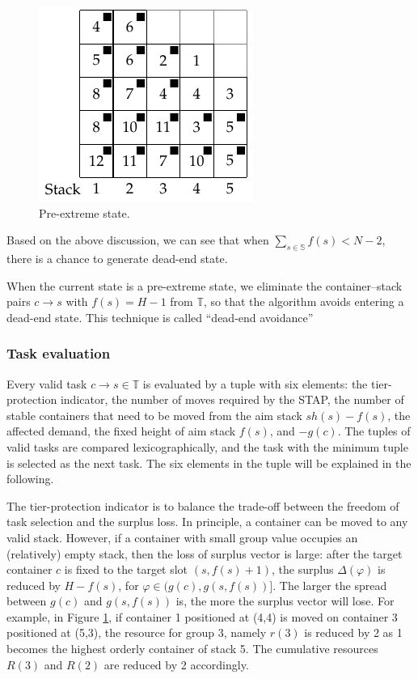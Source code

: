 \documentclass[review,3p,times,12pt,number]{elsarticle}\usepackage{amsmath}\usepackage{amssymb}
\begin{document}
\begin{figure}[htbp]
\centering
\includegraphics{figs/c.pdf}
\caption{Pre-extreme state.}
\label{fig:pre-extreme}
\end{figure}
Based on the above discussion, we can see that when $\sum_{s\in\mathbb{S}}f(s)<N-2$, there is a chance to generate dead-end state.

When the current state is a pre-extreme state, we eliminate the container--stack pairs $c\rightarrow s$ with $f(s)=H-1$ from $\mathbb T$, so that the algorithm avoids entering a dead-end state. This technique is called ``dead-end avoidance''
\subsubsection{Task evaluation}

Every valid task $c\rightarrow s\in\mathbb{T}$ is evaluated by a tuple with six elements: the tier-protection indicator, the number of moves required by the STAP, the number of stable containers that need to be moved from the aim stack $sh(s)-f(s)$, the affected demand, the fixed height of aim stack $f(s)$, and $-g(c)$.
The tuples of valid tasks are compared lexicographically, and the task with the minimum tuple is selected as the next task. The six elements in the tuple will be explained in the following.

The tier-protection indicator is to balance the trade-off between the freedom of task selection and the surplus loss. In principle, a container can be moved to any valid stack.
However, if a container with small group value occupies an (relatively) empty stack, then the loss of surplus vector is large: after the target container $c$ is fixed to the target slot $(s,f(s)+1)$, the surplus $\Delta(\varphi)$ is reduced by $H-f(s)$, for $\varphi\in (g(c),g(s,f(s))]$.
The larger the spread between $g(c)$ and $g(s,f(s))$ is, the more the surplus vector will lose. For example, in Figure \ref{fig:pre-extreme}, if container 1 positioned at (4,4) is moved on container 3 positioned at (5,3), the resource for group 3, namely $r(3)$ is reduced by 2 as 1 becomes the highest orderly container of stack 5. The cumulative resources $R(3)$ and $R(2)$ are reduced by 2 accordingly.
\end{document}
